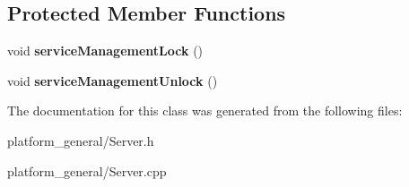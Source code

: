 \subsection*{\-Protected \-Member \-Functions}
\begin{DoxyCompactItemize}
\item 
\hypertarget{classgeneral__server_1_1Server_a8a43793b8255f976ac32b22b5c2bb848}{void {\bfseries service\-Management\-Lock} ()}\label{classgeneral__server_1_1Server_a8a43793b8255f976ac32b22b5c2bb848}

\item 
\hypertarget{classgeneral__server_1_1Server_af5640f613bc691d727c1ee40c7f417cd}{void {\bfseries service\-Management\-Unlock} ()}\label{classgeneral__server_1_1Server_af5640f613bc691d727c1ee40c7f417cd}

\end{DoxyCompactItemize}


\-The documentation for this class was generated from the following files\-:\begin{DoxyCompactItemize}
\item 
platform\-\_\-general/\-Server.\-h\item 
platform\-\_\-general/\-Server.\-cpp\end{DoxyCompactItemize}
